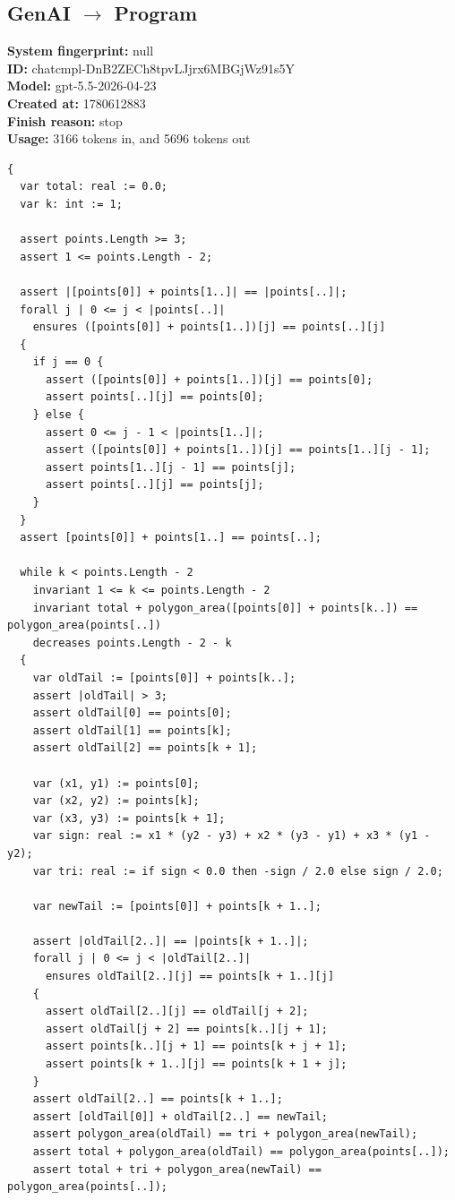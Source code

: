 \documentclass{article}
\begin{document}
\subsection*{GenAI $\rightarrow$ Program}
\textbf{System fingerprint: }null
\\\textbf{ID: }chatcmpl-DnB2ZECh8tpvLJjrx6MBGjWz91s5Y
\\\textbf{Model: }gpt-5.5-2026-04-23
\\\textbf{Created at: }1780612883
\\\textbf{Finish reason: }stop
\\\textbf{Usage: }3166 tokens in, and 5696 tokens out
\begin{lstlisting}
{
  var total: real := 0.0;
  var k: int := 1;

  assert points.Length >= 3;
  assert 1 <= points.Length - 2;

  assert |[points[0]] + points[1..]| == |points[..]|;
  forall j | 0 <= j < |points[..]|
    ensures ([points[0]] + points[1..])[j] == points[..][j]
  {
    if j == 0 {
      assert ([points[0]] + points[1..])[j] == points[0];
      assert points[..][j] == points[0];
    } else {
      assert 0 <= j - 1 < |points[1..]|;
      assert ([points[0]] + points[1..])[j] == points[1..][j - 1];
      assert points[1..][j - 1] == points[j];
      assert points[..][j] == points[j];
    }
  }
  assert [points[0]] + points[1..] == points[..];

  while k < points.Length - 2
    invariant 1 <= k <= points.Length - 2
    invariant total + polygon_area([points[0]] + points[k..]) == polygon_area(points[..])
    decreases points.Length - 2 - k
  {
    var oldTail := [points[0]] + points[k..];
    assert |oldTail| > 3;
    assert oldTail[0] == points[0];
    assert oldTail[1] == points[k];
    assert oldTail[2] == points[k + 1];

    var (x1, y1) := points[0];
    var (x2, y2) := points[k];
    var (x3, y3) := points[k + 1];
    var sign: real := x1 * (y2 - y3) + x2 * (y3 - y1) + x3 * (y1 - y2);
    var tri: real := if sign < 0.0 then -sign / 2.0 else sign / 2.0;

    var newTail := [points[0]] + points[k + 1..];

    assert |oldTail[2..]| == |points[k + 1..]|;
    forall j | 0 <= j < |oldTail[2..]|
      ensures oldTail[2..][j] == points[k + 1..][j]
    {
      assert oldTail[2..][j] == oldTail[j + 2];
      assert oldTail[j + 2] == points[k..][j + 1];
      assert points[k..][j + 1] == points[k + j + 1];
      assert points[k + 1..][j] == points[k + 1 + j];
    }
    assert oldTail[2..] == points[k + 1..];
    assert [oldTail[0]] + oldTail[2..] == newTail;
    assert polygon_area(oldTail) == tri + polygon_area(newTail);
    assert total + polygon_area(oldTail) == polygon_area(points[..]);
    assert total + tri + polygon_area(newTail) == polygon_area(points[..]);


\end{lstlisting}
\end{document}
